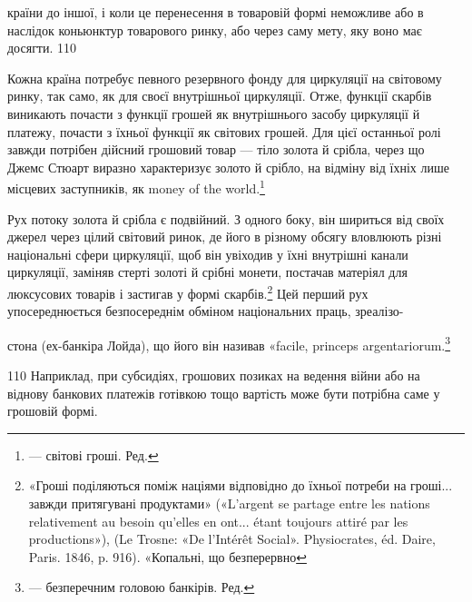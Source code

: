 країни до іншої, і коли це перенесення в товаровій формі неможливе
або в наслідок коньюнктур товарового ринку, або через
саму мету, яку воно має досягти. 110

Кожна країна потребує певного резервного фонду для циркуляції
на світовому ринку, так само, як для своєї внутрішньої
циркуляції. Отже, функції скарбів виникають почасти з функції
грошей як внутрішнього засобу циркуляції й платежу, почасти
з їхньої функції як світових грошей. Для цієї останньої
ролі завжди потрібен дійсний грошовий товар — тіло золота
й срібла, через що Джемс Стюарт виразно характеризує золото
й срібло, на відміну від їхніх лише місцевих заступників, як
money of the world.\footnote*{
— світові гроші. Ред.
}

Рух потоку золота й срібла є подвійний. З одного боку, він
шириться від своїх джерел через цілий світовий ринок, де його
в різному обсягу вловлюють різні національні сфери циркуляції,
щоб він увіходив у їхні внутрішні канали циркуляції, заміняв
стерті золоті й срібні монети, постачав матеріял для люксусових
товарів і застигав у формі скарбів.\footnote{
«Гроші поділяються поміж націями відповідно до їхньої потреби
на гроші... завжди притягувані продуктами» («L’argent se partage
entre les nations relativement au besoin qu’elles en ont... étant toujours
attiré par les productions»), (Le Trosne: «De l’Intérêt Social». Physiocrates,
éd. Daire, Paris. 1846, p. 916). «Копальні, що безперервно
} Цей перший рух упосереднюється
безпосереднім обміном національних праць, зреалізо-

стона (ех-банкіра Лойда), що його він називав «facile, princeps argentariorum.\footnote*{
— безперечним головою банкірів. Ред.
}

110    Наприклад, при субсидіях, грошових позиках на ведення війни
або на віднову банкових платежів готівкою тощо вартість може бути потрібна
саме у грошовій формі.